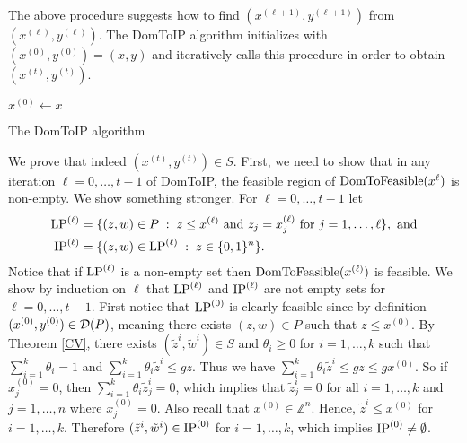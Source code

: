 The above procedure suggests how to find $(x^{(\ell+1)},y^{(\ell+1)})$ from $(x^{(\ell)},y^{(\ell)})$. The DomToIP algorithm initializes with $(x^{(0)},y^{(0)})=(x,y)$ and  iteratively calls this procedure in order to obtain $(x^{(t)},y^{(t)})$. 

\vspace*{10pt}
\begin{algorithm}[H]
	$x^{(0)}\leftarrow x$\\
	\caption{The DomToIP algorithm}
	\label{domtoIPalg}
\end{algorithm}
\vspace*{10pt}
We prove that indeed $(x^{(t)},y^{(t)})\in S$. First, we need to show that in any iteration $\ell=  0,\ldots,t-1$ of DomToIP, the feasible region of $\operatorname{DomToFeasible}(x^{\ell})$ is non-empty. We show something stronger. For $\ell=0,\ldots,t-1$ let
	\begin{align*}
	\operatorname{LP}^{(\ell)}&= \{(z,w)\in P\; : \; z\leq x^{(\ell)} \mbox{ and } z_j=x_j^{(\ell)} \mbox{ for } j=1,\ldots,\ell\}, \text{ and}\\
	\operatorname{IP}^{(\ell)}&= \{(z,w)\in \operatorname{LP}^{(\ell)}\; : \; z\in \{0,1\}^n\}.
	\end{align*}
	Notice that if $\operatorname{LP}^{(\ell)}$ is a non-empty set then $\operatorname{DomToFeasible}(x^{(\ell)})$ is feasible. We show by induction on $\ell$ that $\operatorname{LP}^{(\ell)}$ and $\operatorname{IP}^{(\ell)}$ are not empty sets for $\ell=0,\ldots,t-1$. First notice that $\operatorname{LP}^{(0)}$ is clearly feasible since by definition $(x^{(0)},y^{(0)})\in \operatorname{\mathcal{D}}(P)$, meaning there exists $(z,w)\in P$ such that $z\leq x^{(0)}$. By Theorem \ref{CV}, there exists $(\tilde{z}^i,\tilde{w}^i) \in S$ and $\theta_i\geq 0$ for $i=1,\ldots,k$ such that $\sum_{i=1}^{k} \theta_i = 1$ and $\sum_{i=1}^{k}\theta_i \tilde{z}^i \leq gz$.	Thus we have $\sum_{i=1}^{k}\theta_i \tilde{z}^i \leq gz\leq gx^{(0)}$. So if $x^{(0)}_j=0$, then $ \sum_{i=1}^{k}\theta_i \tilde{z}_j^i =0$, which implies that $\tilde{z}^i_j=0$ for all $i=1,\ldots,k$ and $j= 1,\ldots,n$ where $x^{(0)}_j=0$. Also recall that $x^{(0)}\in \mathbb{Z}^n$.	Hence, $\tilde{z}^i\leq x^{(0)}$ for $i=1,\ldots,k$. Therefore $(\tilde{z}^i,\tilde{w}^i)\in \operatorname{IP}^{(0)}$ for $i=1,\ldots,k$, which implies $\operatorname{IP}^{(0)}\neq \emptyset$.
	

